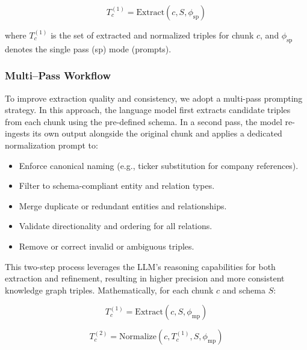
\begin{equation}
T_c^{(1)} = \mathrm{Extract}(c, S, \phi_{\mathrm{sp}})
\label{eq:single_pass_prompting}
\end{equation}

where $T_c^{(1)}$ is the set of extracted and normalized triples for chunk $c$, and $\phi_{\mathrm{sp}}$ denotes the single pass (sp) mode (prompts).
\subsubsection{Multi–Pass Workflow}

To improve extraction quality and consistency, we adopt a multi-pass prompting strategy. In this approach, the language model first extracts candidate triples from each chunk using the pre-defined schema. In a second pass, the model re-ingests its own output alongside the original chunk and applies a dedicated normalization prompt to:
\begin{itemize}
  \item Enforce canonical naming (e.g., ticker substitution for company references).
  \item Filter to schema-compliant entity and relation types.
  \item Merge duplicate or redundant entities and relationships.
  \item Validate directionality and ordering for all relations.
  \item Remove or correct invalid or ambiguous triples.
\end{itemize}
This two-step process leverages the LLM's reasoning capabilities for both extraction and refinement, resulting in higher precision and more consistent knowledge graph triples.
Mathematically, for each chunk $c$ and schema $S$:

\begin{equation}
T_c^{(1)} = \mathrm{Extract}(c, S, \phi_{\mathrm{mp}})
\label{eq:multi_pass_prompting_1}
\end{equation}

\begin{equation}
T_c^{(2)} = \mathrm{Normalize}(c, T_c^{(1)}, S, \phi_{\mathrm{mp}})
\label{eq:multi_pass_prompting_2}
\end{equation}

